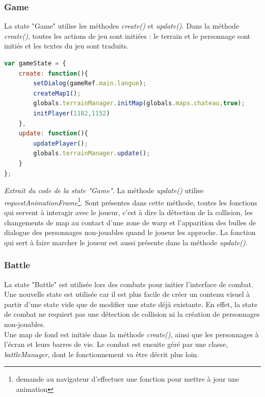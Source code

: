 \documentclass[11pt]{article}
\begin{document}
\begin{appendices}
\subsubsection{Game}
La state "Game" utilise les méthodes \textit{create()} et \textit{update()}. Dans la méthode \textit{create()}, toutes les actions de jeu sont initiées : le terrain et le personnage sont initiés et les textes du jeu sont traduits.
\begin{lstlisting}[language=JavaScript]
var gameState = {
    create: function(){
        setDialog(gameRef.main.langue);
        createMap1();
        globals.terrainManager.initMap(globals.maps.chateau,true);
        initPlayer(1182,1152)
    },
    update: function(){
        updatePlayer();
        globals.terrainManager.update();
    }
};
\end{lstlisting} 
\textit{Extrait du code de la state "Game".}
La méthode \textit{update()} utilise \textit{requestAnimationFrame}\footnote{demande au navigateur d'effectuer une fonction pour mettre à jour une animation}. Sont présentes dans cette méthode, toutes les fonctions qui servent à interagir avec le joueur, c'est à dire la détection de la collision, les changements de map au contact d'une zone de warp et l'apparition des bulles de dialogue des personnages non-jouables quand le joueur les approche. La fonction qui sert à faire marcher le joueur est aussi présente dans la méthode \textit{update()}.
\subsubsection{Battle}
La state "Battle" est utilisée lors des combats pour initier l'interface de combat. Une nouvelle state est utilisée car il est plus facile de créer un contenu visuel à partir d'une state vide que de modifier une state déjà existante. En effet, la state de combat ne requiert pas une détection de collision ni la création de personnages non-jouables.\\

Une map de fond est initiée dans la méthode \textit{create()}, ainsi que les personnages à l'écran et leurs barres de vie. Le combat est ensuite géré par une classe, \textit{battleManager}, dont le fonctionnement va être décrit plus loin.

\end{appendices}
\end{document}
